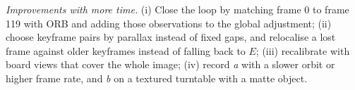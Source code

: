 \documentclass[conference]{assets/latex/IEEEtran}
\begin{document}
\textit{Improvements with more time.} (i) Close the loop by matching frame 0 to frame 119 with ORB and
adding those observations to the global adjustment; (ii) choose keyframe pairs by parallax instead of
fixed gaps, and relocalise a lost frame against older keyframes instead of falling back to $E$;
(iii) recalibrate with board views that cover the whole image; (iv) record \textit{a} with a slower
orbit or higher frame rate, and \textit{b} on a textured turntable with a matte object.

\printbibliography
\end{document}
